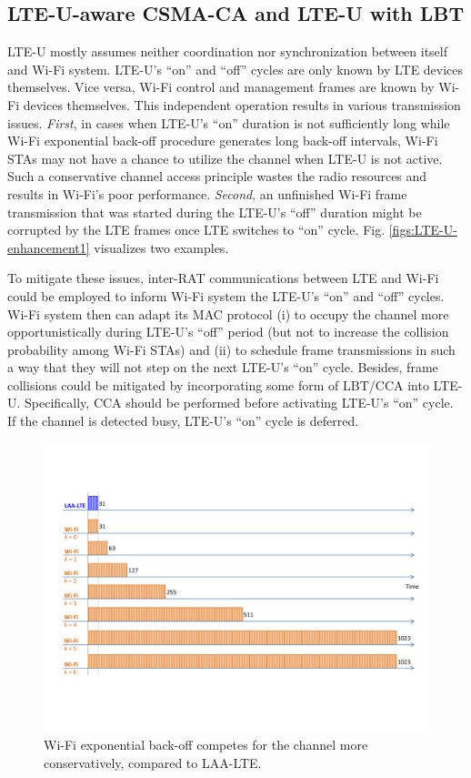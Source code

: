 \documentclass[12pt,onecolumn]{article}
\begin{document}
\subsection{LTE-U-aware CSMA-CA and LTE-U with LBT}
\label{subsection:LTE-U-aware}

LTE-U mostly assumes neither coordination nor synchronization between itself and Wi-Fi system. LTE-U's ``on'' and ``off'' cycles are only known by LTE devices themselves. Vice versa, Wi-Fi control and management frames are known by Wi-Fi devices themselves. This independent operation results in various transmission issues. \textit{First}, in cases when LTE-U's ``on'' duration is not sufficiently long while Wi-Fi exponential back-off procedure generates long back-off intervals, Wi-Fi STAs may not have a chance to utilize the channel when LTE-U is not active. Such a conservative channel access principle wastes the radio resources and results in Wi-Fi's poor performance. \textit{Second}, an unfinished Wi-Fi frame transmission that was started during the LTE-U's ``off'' duration might be corrupted by the LTE frames once LTE switches to ``on'' cycle. Fig. \ref{figs:LTE-U-enhancement1} visualizes two examples.

To mitigate these issues, inter-RAT communications between LTE and Wi-Fi could be employed to inform Wi-Fi system the LTE-U's ``on'' and ``off'' cycles. Wi-Fi system then can adapt its MAC protocol (i) to occupy the channel more opportunistically during LTE-U's ``off'' period (but not to increase the collision probability among Wi-Fi STAs) and (ii) to schedule frame transmissions in such a way that they will not step on the next LTE-U's ``on'' cycle. Besides, frame collisions could be mitigated by incorporating some form of LBT/CCA into LTE-U. Specifically, CCA should be performed before activating LTE-U's ``on'' cycle. If the channel is detected busy, LTE-U's ``on'' cycle is deferred.

\begin{figure}[!t]
\centering
\includegraphics[width=1.0\columnwidth]{figures2/LAA-LTE-enhacement-back-off}
\caption{Wi-Fi exponential back-off competes for the channel more conservatively, compared to LAA-LTE.}
\label{figs:LAA-LTE-enhacement-back-off}
\end{figure}
\end{document}
